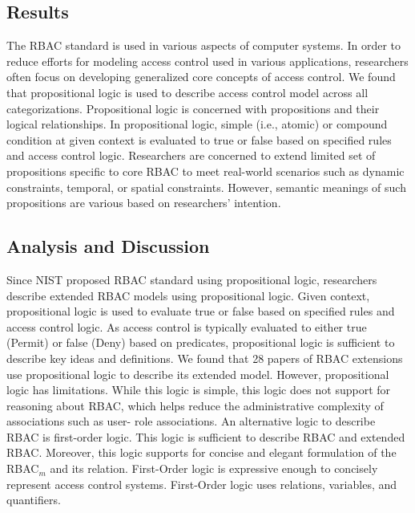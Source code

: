 \subsection{Results}

The RBAC standard is used in various aspects of computer systems. In order to reduce efforts for modeling access control used in various applications, researchers often focus on developing generalized core concepts of access control.
We found that propositional logic is used to describe access control model across all categorizations. Propositional logic is concerned with propositions and their logical relationships. In propositional logic, simple (i.e., atomic) or compound condition at given context is evaluated to true or false based on specified rules and access control logic. Researchers are concerned to extend limited set of propositions specific to core RBAC to meet real-world scenarios such as dynamic constraints, temporal, or spatial constraints. However, semantic meanings of such propositions are various based on researchers' intention.

\subsection{Analysis and Discussion}

Since NIST proposed RBAC standard using propositional logic, researchers describe extended RBAC models using propositional logic. Given context, propositional logic is used to evaluate true or false based on specified rules and access control logic. As access control is typically evaluated to either true (Permit) or false (Deny) based on predicates, propositional logic is sufficient to describe key ideas and definitions. We found that 28 papers of RBAC extensions use propositional logic to describe its extended model.
However, propositional logic has limitations. While this logic is simple, this logic does not support for reasoning about RBAC, which helps reduce the administrative complexity of associations such as user- role associations. An alternative logic to describe RBAC is first-order logic. This logic is sufficient to describe RBAC and extended RBAC. Moreover, this logic supports for concise and elegant formulation of the RBAC$_{m}$ and its relation.  First-Order logic is expressive enough to concisely represent access control systems. First-Order logic uses relations, variables, and quantifiers.
